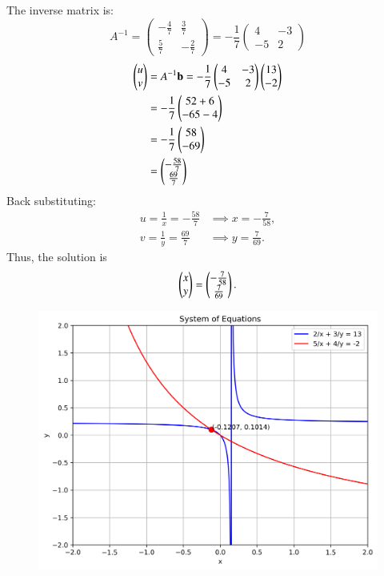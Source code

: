 \documentclass[journal]{IEEEtran}
\begin{document}
The inverse matrix is:
\[
A^{-1} = 
\begin{pmatrix}
	-\frac{4}{7} & \frac{3}{7} \\
	\frac{5}{7} & -\frac{2}{7}
\end{pmatrix}
= -\frac{1}{7}
\begin{pmatrix}
	4 & -3 \\
	-5 & 2
\end{pmatrix}
\]
\begin{align}
	\begin{pmatrix}u \\ v\end{pmatrix} 
	&= A^{-1}\mathbf{b} = -\frac{1}{7}\begin{pmatrix}4 & -3 \\ -5 & 2\end{pmatrix}\begin{pmatrix}13 \\ -2\end{pmatrix} \\
	&= -\frac{1}{7}\begin{pmatrix}52+6 \\ -65-4\end{pmatrix} \\
	&= -\frac{1}{7}\begin{pmatrix}58 \\ -69\end{pmatrix} \\
	&= \begin{pmatrix}-\frac{58}{7} \\ \frac{69}{7}\end{pmatrix}
	\end{align}
	Back substituting:
	\begin{align}
		u = \frac{1}{x} = -\frac{58}{7} &\implies x = -\frac{7}{58}, \\
		v = \frac{1}{y} = \frac{69}{7} &\implies y = \frac{7}{69}.
	\end{align}
	Thus, the solution is
	\begin{align}
		\begin{pmatrix}x \\ y\end{pmatrix} = \begin{pmatrix}-\tfrac{7}{58} \\ \tfrac{7}{69}\end{pmatrix}.
	\end{align}
	\begin{figure}[H]
		\centering
		\includegraphics[width=1\linewidth]{figs/equation_plot}
		\caption{}
		\label{fig:equationplot}
	\end{figure}
	
	
	
\end{document}
